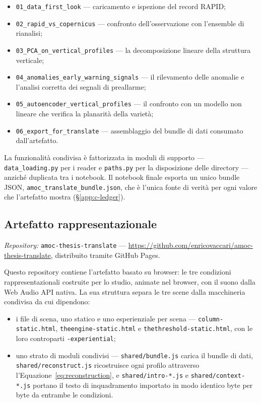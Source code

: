\begin{itemize}
    \item \texttt{01\_data\_first\_look} --- caricamento e ispezione del record RAPID;
    \item \texttt{02\_rapid\_vs\_copernicus} --- confronto dell'osservazione con l'ensemble di
          rianalisi;
    \item \texttt{03\_PCA\_on\_vertical\_profiles} --- la decomposizione lineare della struttura
          verticale;
    \item \texttt{04\_anomalies\_early\_warning\_signals} --- il rilevamento delle anomalie e
          l'analisi corretta dei segnali di preallarme;
    \item \texttt{05\_autoencoder\_vertical\_profiles} --- il confronto con un modello non lineare
          che verifica la planarità della varietà;
    \item \texttt{06\_export\_for\_translate} --- assemblaggio del bundle di dati consumato
          dall'artefatto.
\end{itemize}

\noindent La funzionalità condivisa è fattorizzata in moduli di supporto --- \texttt{data\_loading.py}
per i reader e \texttt{paths.py} per la disposizione delle directory --- anziché duplicata tra i
notebook. Il notebook finale esporta un unico bundle JSON,
\texttt{amoc\_translate\_bundle.json}, che è l'unica fonte di verità per ogni valore che l'artefatto
mostra (\S\ref{app:c-ledger}).

\subsection*{Artefatto rappresentazionale}
\textit{Repository:} \texttt{amoc-thesis-translate} ---
\url{https://github.com/enricovaccari/amoc-thesis-translate}, distribuito tramite GitHub Pages.

Questo repository contiene l'artefatto basato su browser: le tre condizioni rappresentazionali
costruite per lo studio, animate nel browser, con il suono dalla Web Audio API nativa. La sua
struttura separa le tre scene dalla macchineria condivisa da cui dipendono:

\begin{itemize}
    \item i file di scena, uno statico e uno esperienziale per scena ---
          \nolinkurl{column-static.html}, \nolinkurl{theengine-static.html} e
          \nolinkurl{thethreshold-static.html}, con le loro controparti \texttt{-experiential};
    \item uno strato di moduli condivisi --- \texttt{shared/bundle.js} carica il bundle di dati,
          \texttt{shared/reconstruct.js} ricostruisce ogni profilo attraverso
          l'Equazione~\ref{eq:reconstruction}, e \texttt{shared/intro-*.js} e
          \texttt{shared/context-*.js} portano il testo di inquadramento importato in modo identico
          byte per byte da entrambe le condizioni.
\end{itemize}

